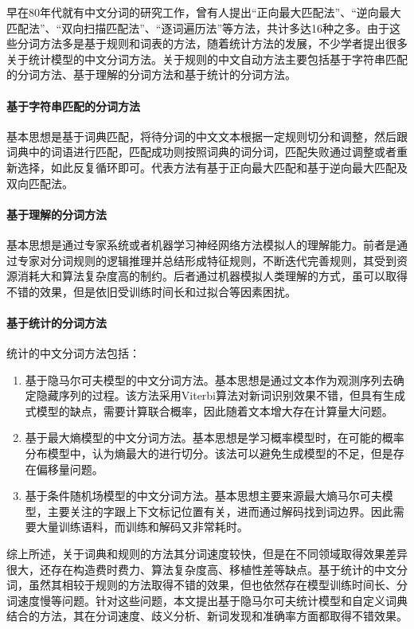 \documentclass[11pt,a4paper]{article}
\begin{document}
早在80年代就有中文分词的研究工作，曾有人提出“正向最大匹配法”、“逆向最大匹配法”、“双向扫描匹配法”、“逐词遍历法”等方法，共计多达16种之多。由于这些分词方法多是基于规则和词表的方法，随着统计方法的发展，不少学者提出很多关于统计模型的中文分词方法。关于规则的中文自动方法主要包括基于字符串匹配的分词方法、基于理解的分词方法和基于统计的分词方法。

\paragraph{基于字符串匹配的分词方法}
基本思想是基于词典匹配，将待分词的中文文本根据一定规则切分和调整，然后跟词典中的词语进行匹配，匹配成功则按照词典的词分词，匹配失败通过调整或者重新选择，如此反复循环即可。代表方法有基于正向最大匹配和基于逆向最大匹配及双向匹配法。

\paragraph{基于理解的分词方法}
基本思想是通过专家系统或者机器学习神经网络方法模拟人的理解能力。前者是通过专家对分词规则的逻辑推理并总结形成特征规则，不断迭代完善规则，其受到资源消耗大和算法复杂度高的制约。后者通过机器模拟人类理解的方式，虽可以取得不错的效果，但是依旧受训练时间长和过拟合等因素困扰。

\paragraph{基于统计的分词方法}
统计的中文分词方法包括：

\begin{enumerate}
	\item 
基于隐马尔可夫模型的中文分词方法。基本思想是通过文本作为观测序列去确定隐藏序列的过程。该方法采用Viterbi算法对新词识别效果不错，但具有生成式模型的缺点，需要计算联合概率，因此随着文本增大存在计算量大问题。
	\item 基于最大熵模型的中文分词方法。基本思想是学习概率模型时，在可能的概率分布模型中，认为熵最大的进行切分。该法可以避免生成模型的不足，但是存在偏移量问题。
	\item 基于条件随机场模型的中文分词方法。基本思想主要来源最大熵马尔可夫模型，主要关注的字跟上下文标记位置有关，进而通过解码找到词边界。因此需要大量训练语料，而训练和解码又非常耗时。
\end{enumerate}

综上所述，关于词典和规则的方法其分词速度较快，但是在不同领域取得效果差异很大，还存在构造费时费力、算法复杂度高、移植性差等缺点。基于统计的中文分词，虽然其相较于规则的方法取得不错的效果，但也依然存在模型训练时间长、分词速度慢等问题。针对这些问题，本文提出基于隐马尔可夫统计模型和自定义词典结合的方法，其在分词速度、歧义分析、新词发现和准确率方面都取得不错效果。
\end{document}
